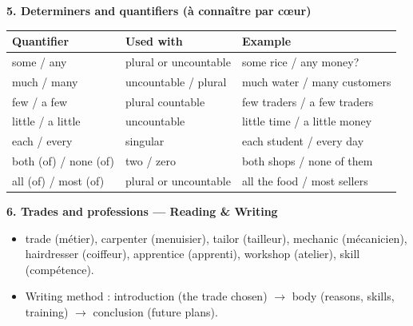 \documentclass[11pt]{article}
\newcommand{\cle}[1]{{\popxbold\color{popdark}#1}}
\begin{document}
\begin{bilan}
\textbf{5. Determiners and quantifiers (à connaître par c\oe ur)}
\begin{center}
\begin{tabularx}{\linewidth}{|l|X|X|}\hline
\rowcolor{popblueL} \textbf{Quantifier} & \textbf{Used with} & \textbf{Example} \\ \hline
some / any & plural or uncountable & some rice / any money? \\ \hline
much / many & uncountable / plural & much water / many customers \\ \hline
few / a few & plural countable & few traders / a few traders \\ \hline
little / a little & uncountable & little time / a little money \\ \hline
each / every & singular & each student / every day \\ \hline
both (of) / none (of) & two / zero & both shops / none of them \\ \hline
all (of) / most (of) & plural or uncountable & all the food / most sellers \\ \hline
\end{tabularx}
\end{center}

\textbf{6. Trades and professions — Reading \& Writing}
\begin{itemize}
\item \cle{trade} (métier), \cle{carpenter} (menuisier), \cle{tailor} (tailleur), \cle{mechanic} (mécanicien), \cle{hairdresser} (coiffeur), \cle{apprentice} (apprenti), \cle{workshop} (atelier), \cle{skill} (compétence).
\item Writing method : introduction (the trade chosen) $\rightarrow$ body (reasons, skills, training) $\rightarrow$ conclusion (future plans).
\end{itemize}
\end{bilan}
\end{document}
